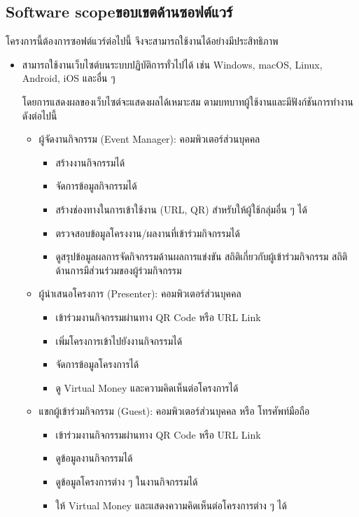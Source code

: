 \subsection{\ifenglish Software scope\else ขอบเขตด้านซอฟต์แวร์\fi}
โครงการนี้ต้องการซอฟต์แวร์ต่อไปนี้ จึงจะสามารถใช้งานได้อย่างมีประสิทธิภาพ
\begin{itemize}
    \item สามารถใช้งานเว็บไซต์บนระบบปฏิบัติการทั่วไปได้ เช่น Windows, macOS, Linux, Android, iOS และอื่น ๆ

          โดยการแสดงผลของเว็บไซต์จะแสดงผลได้เหมาะสม ตามบทบาทผู้ใช้งานและมีฟังก์ชันการทำงานดังต่อไปนี้
          \begin{itemize}
              \item ผู้จัดงานกิจกรรม (Event Manager):
                    คอมพิวเตอร์ส่วนบุคคล
                    \begin{itemize}
                        \item สร้างงานกิจกรรมได้
                        \item จัดการข้อมูลกิจกรรมได้
                        \item สร้างช่องทางในการเข้าใช้งาน (URL, QR) สำหรับให้ผู้ใช้กลุ่มอื่น ๆ ได้
                        \item ตรวจสอบข้อมูลโครงงาน/ผลงานที่เข้าร่วมกิจกรรมได้
                        \item ดูสรุปข้อมูลผลการจัดกิจกรรมด้านผลการแข่งขัน สถิติเกี่ยวกับผู้เข้าร่วมกิจกรรม สถิติด้านการมีส่วนร่วมของผู้ร่วมกิจกรรม
                    \end{itemize}
              \item ผู้นำเสนอโครงการ (Presenter):
                    คอมพิวเตอร์ส่วนบุคคล
                    \begin{itemize}
                        \item เข้าร่วมงานกิจกรรมผ่านทาง QR Code หรือ URL Link
                        \item เพิ่มโครงการเข้าไปยังงานกิจกรรมได้
                        \item จัดการข้อมูลโครงการได้
                        \item ดู Virtual Money และความคิดเห็นต่อโครงการได้
                    \end{itemize}
              \item แขกผู้เข้าร่วมกิจกรรม (Guest):
                    คอมพิวเตอร์ส่วนบุคคล หรือ โทรศัพท์มือถือ
                    \begin{itemize}
                        \item เข้าร่วมงานกิจกรรมผ่านทาง QR Code หรือ URL Link
                        \item ดูข้อมูลงานกิจกรรมได้
                        \item ดูข้อมูลโครงการต่าง ๆ ในงานกิจกรรมได้
                        \item ให้ Virtual Money และแสดงความคิดเห็นต่อโครงการต่าง ๆ ได้
                    \end{itemize}
          \end{itemize}
\end{itemize}

